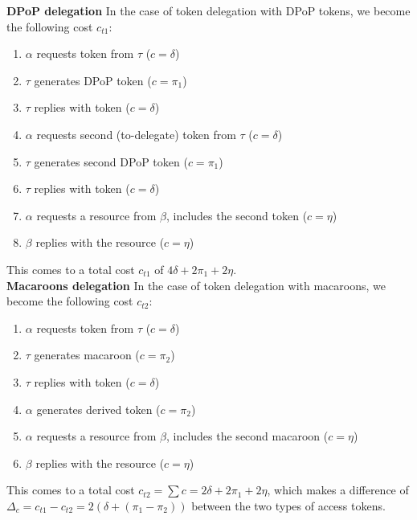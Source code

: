 \noindent\textbf{DPoP delegation} In the case of token delegation with \gls{DPoP} tokens, we become the following cost $c_{t1}$:
\begin{enumerate}
    \item $\alpha$ requests token from $\tau$ ($c = \delta$)
    \item $\tau$ generates \gls{DPoP} token ($c = \pi_1$)
    \item $\tau$ replies with token ($c = \delta$)
    \item $\alpha$ requests second (to-delegate) token from $\tau$ ($c = \delta$)
    \item $\tau$ generates second \gls{DPoP} token ($c = \pi_1$)
    \item $\tau$ replies with token ($c = \delta$)
    \item $\alpha$ requests a resource from $\beta$, includes the second token ($c = \eta$)
    \item $\beta$ replies with the resource ($c = \eta$)
\end{enumerate}
\noindent This comes to a total cost $c_{t1}$ of $4\delta + 2\pi_1 + 2\eta$.\\

\noindent\textbf{Macaroons delegation} In the case of token delegation with macaroons, we become the following cost $c_{t2}$:
\begin{enumerate}
    \item $\alpha$ requests token from $\tau$ ($c = \delta$)
    \item $\tau$ generates macaroon ($c = \pi_2$)
    \item $\tau$ replies with token ($c = \delta$)
    \item $\alpha$ generates derived token ($c = \pi_2$)
    \item $\alpha$ requests a resource from $\beta$, includes the second macaroon ($c = \eta$)
    \item $\beta$ replies with the resource ($c = \eta$)
\end{enumerate}
\noindent This comes to a total cost $c_{t2} = \sum c = 2\delta + 2\pi_1 + 2\eta$, which makes a difference of $\Delta_c = c_{t1} - c_{t2} = 2(\delta + (\pi_1 - \pi_2))$ between the two types of access tokens.

